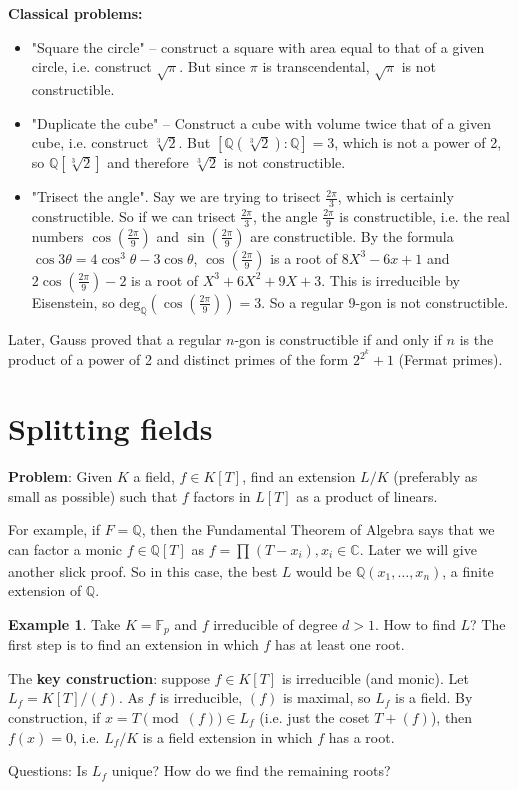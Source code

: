\documentclass{article}
\theoremstyle{definition}
\newtheorem{example}{Example}[section]
\begin{document}
\textbf{Classical problems:} 
\begin{itemize}
    \item "Square the circle" -- construct a square with area equal to that of a given circle, i.e. construct $\sqrt{\pi}$. But since $\pi$ is transcendental, $\sqrt{\pi}$ is not constructible.
    \item "Duplicate the cube" -- Construct a cube with volume twice that of a given cube, i.e. construct $\sqrt[3]{2}$. But $[\mathbb{Q}(\sqrt[3]{2}) : \mathbb{Q}] = 3$, which is not a power of 2, so $\mathbb{Q}[\sqrt[3]{2}]$ and therefore $\sqrt[3]{2}$ is not constructible.
    \item "Trisect the angle". Say we are trying to trisect $\frac{2\pi}{3}$, which is certainly constructible. So if we can trisect $\frac{2\pi}{3}$, the angle $\frac{2\pi}{9}$ is constructible, i.e. the real numbers $\cos\left(\frac{2\pi}{9}\right)$ and $\sin\left(\frac{2\pi}{9}\right)$ are constructible. By the formula $\cos 3\theta = 4\cos^3\theta- 3\cos \theta$, $\cos\left(\frac{2\pi}{9}\right)$ is a root of $8X^3 - 6x + 1$ and $2\cos\left(\frac{2\pi}{9}\right) - 2$ is a root of $X^3 + 6X^2 + 9X + 3$. This is irreducible by Eisenstein, so $\text{deg}_{\mathbb{Q}}(\cos\left(\frac{2\pi}{9}\right)) = 3$. So a regular 9-gon is not constructible.
\end{itemize} 

Later, Gauss proved that a regular $n$-gon is constructible if and only if $n$ is the product of a power of 2 and distinct primes of the form $2^{2^k}+1$ (Fermat primes).

\section{Splitting fields}

\textbf{Problem}: Given $K$ a field, $f \in K[T]$, find an extension $L/K$ (preferably as small as possible) such that $f$ factors in $L[T]$ as a product of linears.
\vspace{1mm}

For example, if $F=\mathbb{Q}$, then the Fundamental Theorem of Algebra says that we can factor a monic $f \in \mathbb{Q}[T]$ as $f = \prod_{}^{} (T-x_i), x_i \in \mathbb{C}$. Later we will give another slick proof. So in this case, the best $L$ would be $\mathbb{Q}(x_1,\ldots,x_n)$, a finite extension of $\mathbb{Q}$.

\begin{example}
    Take $K=\mathbb{F}_p$ and $f$ irreducible of degree $d > 1$. How to find $L$? The first step is to find an extension in which $f$ has at least one root.
    
    The \textbf{key construction}: suppose $f \in K[T]$ is irreducible (and monic). Let $L_f = K[T]/(f)$. As $f$ is irreducible, $(f)$ is maximal, so $L_f$ is a field. By construction, if $x = T \pmod{(f)} \in L_f$ (i.e. just the coset $T+(f)$), then $f(x) = 0$, i.e. $L_f/K$ is a field extension in which $f$ has a root.
\end{example}
Questions: Is $L_f$ unique? How do we find the remaining roots?
\end{document}
